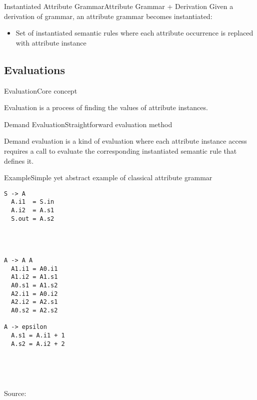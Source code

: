 \begin{frame}{Instantiated Attribute Grammar}{Attribute Grammar + Derivation}
Given a \alert{derivation} of grammar, an attribute grammar becomes \alert{instantiated}:
\begin{itemize}
    \item Set of instantiated semantic rules where each attribute \alert{occurrence} is replaced with attribute \alert{instance}
\end{itemize}

\end{frame}


\subsection*{Evaluations}

\begin{frame}{Evaluation}{Core concept}

Evaluation is a process of finding the \alert{values} of \alert{attribute instances}.

\end{frame}

\begin{frame}{Demand Evaluation}{Straightforward evaluation method}
\begin{definition}
Demand evaluation is a kind of evaluation where each attribute instance access requires a call to evaluate the corresponding instantiated semantic rule that defines it.
\end{definition}

\end{frame}


\begin{frame}[fragile=singleslide]{Example}{Simple yet abstract example of classical attribute grammar}
    
\begin{multicols}{3}
\begin{verbatim}
S -> A
  A.i1  = S.in
  A.i2  = A.s1
  S.out = A.s2




A -> A A
  A1.i1 = A0.i1
  A1.i2 = A1.s1
  A0.s1 = A1.s2
  A2.i1 = A0.i2
  A2.i2 = A2.s1
  A0.s2 = A2.s2

A -> epsilon
  A.s1 = A.i1 + 1
  A.s2 = A.i2 + 2
    
    
    
    
\end{verbatim}
\end{multicols}

Source: \cite{10.1145/225540.225544}
    
\end{frame}


